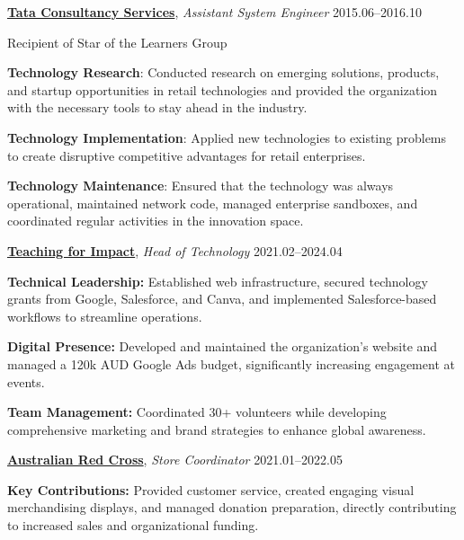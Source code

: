 \documentclass[11pt,article,oneside]{memoir}
\begin{document}
\bigskip

\ind \textbf{\href{https://www.tcs.com/}{Tata Consultancy Services}}, \emph{Assistant System Engineer} \hfill 2015.06--2016.10

\ind \hspace{0.35in} Recipient of Star of the Learners Group

\ind \hspace{0.35in} \textbf{Technology Research}: Conducted research on emerging solutions, products, and startup opportunities in retail technologies and provided the organization with the necessary tools to stay ahead in the industry.

\ind \hspace{0.35in} \textbf{Technology Implementation}: Applied new technologies to existing problems to create disruptive competitive advantages for retail enterprises.

\ind \hspace{0.35in} \textbf{Technology Maintenance}: Ensured that the technology was always operational, maintained network code, managed enterprise sandboxes, and coordinated regular activities in the innovation space.
\vspace{0.5em}

\ind \textbf{\href{https://teachingforimpact.org/}{Teaching for Impact}}, \emph{Head of Technology} \hfill 2021.02--2024.04

\ind \textbf{Technical Leadership:} Established web infrastructure, secured technology grants from Google, Salesforce, and Canva, and implemented Salesforce-based workflows to streamline operations.

\ind \textbf{Digital Presence:} Developed and maintained the organization's website and managed a 120k AUD Google Ads budget, significantly increasing engagement at events.

\ind \textbf{Team Management:} Coordinated 30+ volunteers while developing comprehensive marketing and brand strategies to enhance global awareness.

\bigskip

\ind \textbf{\href{https://www.redcross.org.au/}{Australian Red Cross}}, \emph{Store Coordinator} \hfill 2021.01--2022.05

\ind \textbf{Key Contributions:} Provided customer service, created engaging visual merchandising displays, and managed donation preparation, directly contributing to increased sales and organizational funding.
\end{document}
